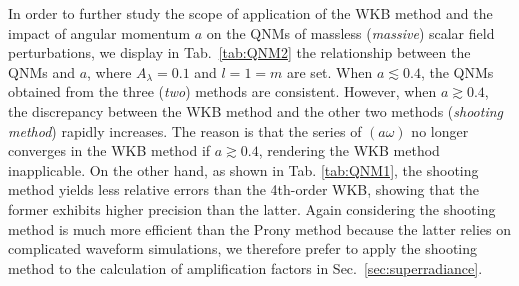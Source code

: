 \documentclass[12pt]{article}
\begin{document}
In order to further study the scope of application of the WKB method and the impact of angular momentum $a$ on the QNMs of massless ({\em massive}) scalar field perturbations, we display in Tab.~\ref{tab:QNM2} the relationship between the QNMs and $a$, where $A_\lambda=0.1$ and $l=1=m$ are set. When $a\lesssim0.4$, the QNMs obtained from the three ({\em two}) methods are consistent. 
However, when $a\gtrsim0.4$, the discrepancy between the WKB method and the other two methods ({\em shooting method}) rapidly increases. 
The reason is that the series of $(a\omega)$ no longer converges in the WKB method  if $a\gtrsim0.4$, rendering the WKB method inapplicable. 
On the other hand, as shown in Tab. \ref{tab:QNM1}, the shooting method yields less relative errors than the 4th-order WKB, showing that the former exhibits higher precision than the latter.
Again considering the shooting method is much more efficient than the Prony method because the latter relies on complicated waveform simulations, we 
therefore prefer to apply the shooting method to the calculation of amplification factors in Sec.~\ref{sec:superradiance}.
\end{document}
